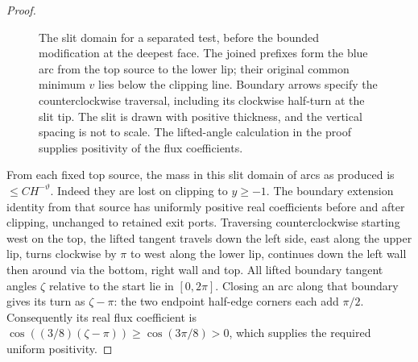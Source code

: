 \begin{proof}
\begin{figure}[ht]
\centering
{}
\caption{The slit domain for a separated test, before the bounded modification at the deepest face. The joined prefixes form the blue arc from the top source to the lower lip; their original common minimum $v$ lies below the clipping line. Boundary arrows specify the counterclockwise traversal, including its clockwise half-turn at the slit tip. The slit is drawn with positive thickness, and the vertical spacing is not to scale. The lifted-angle calculation in the proof supplies positivity of the flux coefficients.}
\label{R:cal:slit-figure}
\end{figure}

From each fixed top source, the mass in this slit domain of arcs as produced is \(\le C H^{-\vartheta}\). Indeed they are lost on clipping to \(y\ge-1\). The boundary extension identity from that source has uniformly positive real coefficients before and after clipping, unchanged to retained exit ports. Traversing counterclockwise starting west on the top, the lifted tangent travels down the left side, east along the upper lip, turns clockwise by \(\pi\) to west along the lower lip, continues down the left wall then around via the bottom, right wall and top. All lifted boundary tangent angles $\zeta$ relative to the start lie in
$[0,2\pi]$. Closing an arc along that boundary gives its turn as
$\zeta-\pi$: the two endpoint half-edge corners each add $\pi/2$.
Consequently its real flux coefficient is
$\cos((3/8)(\zeta-\pi))\ge\cos(3\pi/8)>0$, which supplies the required
uniform positivity.


\end{proof}
